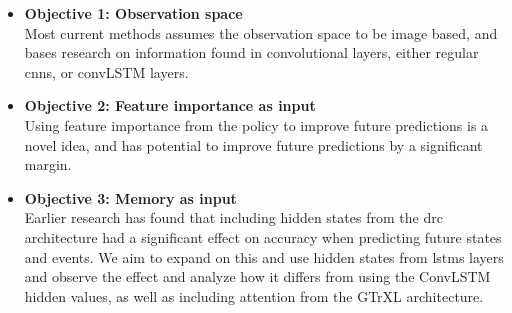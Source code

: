 \documentclass[UKenglish]{uiomasterthesis}
\begin{document}
\begin{itemize}

    \item \textbf{Objective 1: Observation space}\\
        Most current methods assumes the observation space to be image based, and bases research on information found in convolutional layers, either regular \acp{cnn}, or convLSTM layers.
    \item \textbf{Objective 2: Feature importance as input}\\
        Using feature importance from the policy to improve future predictions is a novel idea, and has potential to improve future predictions by a significant margin.

    \item \textbf{Objective 3: Memory as input}\\
        Earlier research has found that including hidden states from the \ac{drc} architecture had a significant effect on accuracy when predicting future states and events. We aim to expand on this and use hidden states from \acp{lstm} layers and observe the effect and analyze how it differs from using the ConvLSTM hidden values, as well as including attention from the GTrXL architecture.

\end{itemize}
\end{document}
